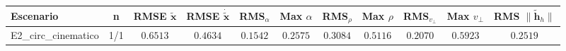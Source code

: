 \begin{tabular}{lcccccccccc}
\toprule
Escenario & n & RMSE $\tilde{\mathbf{x}}$ & RMSE $\dot{\tilde{\mathbf{x}}}$ & RMS$_\alpha$ & Max $\alpha$ & RMS$_\rho$ & Max $\rho$ & RMS$_{v_\perp}$ & Max $v_\perp$ & RMS $\|\tilde{\mathbf{h}}_h\|$ \\
\midrule
E2\_circ\_cinematico & 1/1 & $0.6513$ & $0.4634$ & $0.1542$ & $0.2575$ & $0.3084$ & $0.5116$ & $0.2070$ & $0.5923$ & $0.2519$ \\
\bottomrule
\end{tabular}
